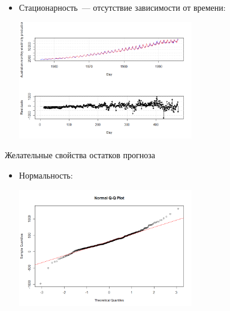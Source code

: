 \documentclass[9pt,pdf,utf8,hyperref={unicode},aspectratio=169]{beamer}
\begin{document}
\begin{frame}

		\begin{itemize}
			\item Стационарность~--- отсутствие зависимости от времени:
			\begin{center}
				\includegraphics[width=0.6\textwidth]{trended.png}			
			\end{center}		
		\end{itemize}		
		
\end{frame}

\begin{frame}{Желательные свойства остатков прогноза}
		\begin{itemize}
			\item Нормальность:
			\begin{center}
				\includegraphics[width=0.6\textwidth]{qqplot.png}			
			\end{center}		
		\end{itemize}	
\end{frame}
\end{document}
